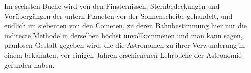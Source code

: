 Im sechsten Buche wird von den Finsternissen, Sternbedeckungen und Vorübergängen der untern Planeten vor der Sonnenscheibe gehandelt, und endlich im siebenten von den Cometen, zu deren Bahnbestimmung hier nur die indirecte Methode in derselben höchst unvollkommenen und man kann sagen, planlosen Gestalt gegeben wird, die die Astronomen zu ihrer Verwunderung in einem bekannten, vor einigen Jahren erschienenen Lehrbuche der Astronomie gefunden haben.
\par\clearpage
\endgroup
